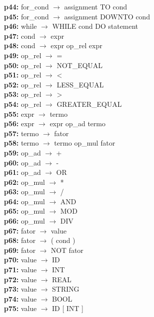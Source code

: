 \documentclass[12pt,a4paper]{report}
\begin{document}
\begin{tabbing}
\textbf{p44:} \> for\_cond \(\to\) assignment TO cond \\
\textbf{p45:} \> for\_cond \(\to\) assignment DOWNTO cond \\
\textbf{p46:} \> while \(\to\) WHILE cond DO statement \\
\textbf{p47:} \> cond \(\to\) expr \\
\textbf{p48:} \> cond \(\to\) expr op\_rel expr \\
\textbf{p49:} \> op\_rel \(\to\) = \\
\textbf{p50:} \> op\_rel \(\to\) NOT\_EQUAL \\
\textbf{p51:} \> op\_rel \(\to\) < \\
\textbf{p52:} \> op\_rel \(\to\) LESS\_EQUAL \\
\textbf{p53:} \> op\_rel \(\to\) > \\
\textbf{p54:} \> op\_rel \(\to\) GREATER\_EQUAL \\
\textbf{p55:} \> expr \(\to\) termo \\
\textbf{p56:} \> expr \(\to\) expr op\_ad termo \\
\textbf{p57:} \> termo \(\to\) fator \\
\textbf{p58:} \> termo \(\to\) termo op\_mul fator \\
\textbf{p59:} \> op\_ad \(\to\) + \\
\textbf{p60:} \> op\_ad \(\to\) - \\
\textbf{p61:} \> op\_ad \(\to\) OR \\
\textbf{p62:} \> op\_mul \(\to\) * \\
\textbf{p63:} \> op\_mul \(\to\) / \\
\textbf{p64:} \> op\_mul \(\to\) AND \\
\textbf{p65:} \> op\_mul \(\to\) MOD \\
\textbf{p66:} \> op\_mul \(\to\) DIV \\
\textbf{p67:} \> fator \(\to\) value \\
\textbf{p68:} \> fator \(\to\) ( cond ) \\
\textbf{p69:} \> fator \(\to\) NOT fator \\
\textbf{p70:} \> value \(\to\) ID \\
\textbf{p71:} \> value \(\to\) INT \\
\textbf{p72:} \> value \(\to\) REAL \\
\textbf{p73:} \> value \(\to\) STRING \\
\textbf{p74:} \> value \(\to\) BOOL \\
\textbf{p75:} \> value \(\to\) ID [ INT ] \\

\end{tabbing}
\end{document}
